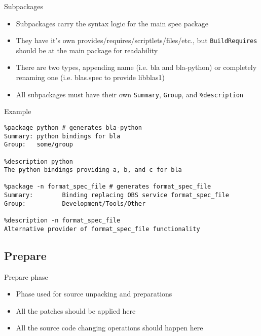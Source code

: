 \documentclass{beamer}
\begin{document}
\begin{frame}[t]{Subpackages}
	\begin{itemize}
	\item Subpackages carry the syntax logic for the main spec package
    \item They have it's own provides/requires/scriptlets/files/etc., but \texttt{BuildRequires} should be at the main package for readability
    \item There are two types, appending name (i.e. bla and bla-python) or completely renaming one (i.e. blas.spec to provide libblas1)
    \item All subpackages must have their own \texttt{Summary}, \texttt{Group}, and \texttt{\%description}
	\end{itemize}
\end{frame}

\begin{frame}[fragile]{Example}
	\begin{small}
\begin{verbatim}
%package python # generates bla-python
Summary: python bindings for bla
Group:   some/group

%description python
The python bindings providing a, b, and c for bla

%package -n format_spec_file # generates format_spec_file
Summary:        Binding replacing OBS service format_spec_file
Group:          Development/Tools/Other

%description -n format_spec_file
Alternative provider of format_spec_file functionality
\end{verbatim}
	\end{small}
\end{frame}

\subsection{Prepare}

\begin{frame}[t]{Prepare phase}
	\begin{itemize}
	\item Phase used for source unpacking and preparations
    \item All the patches should be applied here
    \item All the source code changing operations should happen here
	\end{itemize}
\end{frame}
\end{document}
